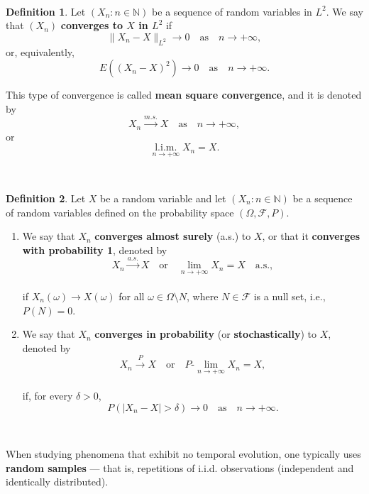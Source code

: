 \documentclass[
  11pt,
  a4paper,
]{book}
\theoremstyle{definition}
\newtheorem{definition}{Definition}[chapter]
\theoremstyle{definition}
\theoremstyle{definition}
\theoremstyle{definition}
\theoremstyle{remark}
\begin{document}
\(\,\)

\begin{definition}
Let \((X_n : n \in \mathbb{N})\) be a sequence of random variables in \(L^2\). We say that \((X_n)\) \textbf{converges to \(X\) in \(L^2\)} if
\[
\|X_n - X\|_{L^2} \rightarrow 0 \quad \text{as} \quad n \to +\infty,
\]
or, equivalently,
\[
E\left((X_n - X)^2\right) \to 0 \quad \text{as} \quad n \to +\infty.
\]

This type of convergence is called \textbf{mean square convergence}, and it is denoted by
\[
X_n \xrightarrow{m.s.} X \quad \text{as} \quad n \to +\infty,
\]
or
\[
\mathop{l.i.m.}\limits_{n \to +\infty} X_n = X.
\]
\end{definition}

\(\,\)

\begin{definition}

Let \(X\) be a random variable and let \((X_n : n \in \mathbb{N})\) be a sequence of random variables defined on the probability space \((\Omega, \mathcal{F}, P)\).

\begin{enumerate}
\def\labelenumi{\arabic{enumi}.}
\item
  We say that \(X_n\) \textbf{converges almost surely} (a.s.) to \(X\), or that it \textbf{converges with probability 1}, denoted by\\
  \[
  X_n \xrightarrow{a.s.} X \quad \text{or} \quad \lim_{n \to +\infty} X_n = X \quad \text{a.s.},
  \]\\
  if \(X_n(\omega) \to X(\omega)\) for all \(\omega \in \Omega \setminus N\), where \(N \in \mathcal{F}\) is a null set, i.e., \(P(N) = 0\).
\item
  We say that \(X_n\) \textbf{converges in probability} (or \textbf{stochastically}) to \(X\), denoted by\\
  \[
  X_n \xrightarrow{P} X \quad \text{or} \quad P\text{-}\lim_{n \to +\infty} X_n = X,
  \]\\
  if, for every \(\delta > 0\),\\
  \[
  P(|X_n - X| > \delta) \to 0 \quad \text{as} \quad n \to +\infty.
  \]
\end{enumerate}

\end{definition}

\(\,\)

When studying phenomena that exhibit no temporal evolution, one typically uses \textbf{random samples} --- that is, repetitions of i.i.d. observations (independent and identically distributed).
\end{document}
